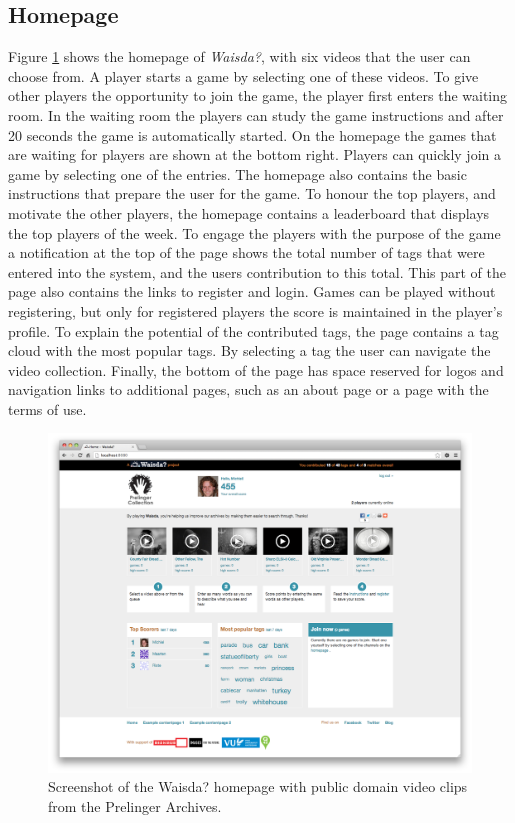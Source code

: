 \subsection{Homepage}
Figure \ref{homepage} shows the homepage of \textit{Waisda?}, with six videos that the user can choose from. A player starts a game by selecting one of these videos. To give other players the opportunity to join the game, the player first enters the waiting room. In the waiting room the players can study the game
instructions and after 20 seconds the game is automatically started. On the homepage the games that are waiting for players are shown at the bottom right. Players can quickly join a game by selecting one of the entries.
The homepage also contains the basic instructions that prepare the user for the game. To honour the top players, and motivate the other players, the homepage contains a leaderboard that displays the top players of the week. To engage the players with the purpose of the game a notification at the top of the page shows the total number of tags that were entered into the system, and the users contribution to this total. This part of the page also contains the links to register and login. Games can be played without registering, but only for registered players the score is maintained in the player’s profile. To explain the potential of the contributed tags, the page contains a tag cloud with the most popular tags. By selecting a tag the user can navigate the video collection. Finally, the bottom of the page has space reserved for logos and navigation links to additional pages, such as an about page or a page with the terms of use.

\begin{figure}[t!]
\centering
\includegraphics[width=\columnwidth]{figs/homepage} 
\caption{Screenshot of the Waisda? homepage with public domain video clips from the Prelinger Archives.}
\label{homepage}
\end{figure}

